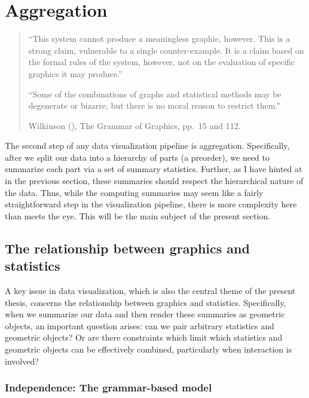 \documentclass[
]{book}
\theoremstyle{definition}
\theoremstyle{definition}
\theoremstyle{definition}
\theoremstyle{definition}
\theoremstyle{remark}
\begin{document}
\section{Aggregation}\label{aggregation}

\begin{quote}
``This system cannot produce a meaningless graphic, however. This is a strong claim, vulnerable to a single counter-example. It is a claim based on the formal rules of the system, however, not on the evaluation of specific graphics it may produce.''

``Some of the combinations of graphs and statistical methods may be degenerate or bizarre, but there is no moral reason to restrict them.''

Wilkinson (), The Grammar of Graphics, pp.~15 and 112.
\end{quote}

The second step of any data visualization pipeline is aggregation. Specifically, after we split our data into a hierarchy of parts (a preorder), we need to summarize each part via a set of summary statistics. Further, as I have hinted at in the previous section, these summaries should respect the hierarchical nature of the data. Thus, while the computing summaries may seem like a fairly straightforward step in the visualization pipeline, there is more complexity here than meets the eye. This will be the main subject of the present section.

\subsection{The relationship between graphics and statistics}\label{the-relationship-between-graphics-and-statistics}

A key issue in data visualization, which is also the central theme of the present thesis, concerns the relationship between graphics and statistics. Specifically, when we summarize our data and then render these summaries as geometric objects, an important question arises: can we pair arbitrary statistics and geometric objects? Or are there constraints which limit which statistics and geometric objects can be effectively combined, particularly when interaction is involved?

\subsubsection{Independence: The grammar-based model}\label{independence-the-grammar-based-model}
\end{document}
